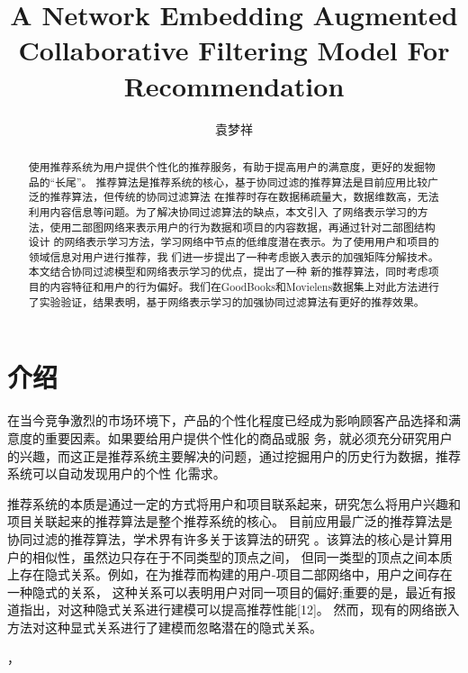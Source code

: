 \documentclass[lang=cn,11pt]{elegantpaper}
\title{A Network Embedding Augmented Collaborative Filtering Model For Recommendation}
\author{袁梦祥}
\institute{安徽大学大数据与云服务工程实验室}
\date{}
\begin{document}
\maketitle

\begin{abstract}
\noindent 使用推荐系统为用户提供个性化的推荐服务，有助于提高用户的满意度，更好的发掘物品的“长尾”。
推荐算法是推荐系统的核心，基于协同过滤的推荐算法是目前应用比较广泛的推荐算法，但传统的协同过滤算法
在推荐时存在数据稀疏量大，数据维数高，无法利用内容信息等问题。为了解决协同过滤算法的缺点，本文引入
了网络表示学习的方法，使用二部图网络来表示用户的行为数据和项目的内容数据，再通过针对二部图结构设计
的网络表示学习方法，学习网络中节点的低维度潜在表示。为了使用用户和项目的领域信息对用户进行推荐，我
们进一步提出了一种考虑嵌入表示的加强矩阵分解技术。本文结合协同过滤模型和网络表示学习的优点，提出了一种
新的推荐算法，同时考虑项目的内容特征和用户的行为偏好。我们在GoodBooks和Movielens数据集上对此方法进行
了实验验证，结果表明，基于网络表示学习的加强协同过滤算法有更好的推荐效果。
\end{abstract}


\section{介绍}

在当今竞争激烈的市场环境下，产品的个性化程度已经成为影响顾客产品选择和满意度的重要因素。如果要给用户提供个性化的商品或服
务，就必须充分研究用户的兴趣，而这正是推荐系统主要解决的问题，通过挖掘用户的历史行为数据，推荐系统可以自动发现用户的个性
化需求。

推荐系统的本质是通过一定的方式将用户和项目联系起来，研究怎么将用户兴趣和项目关联起来的推荐算法是整个推荐系统的核心。
目前应用最广泛的推荐算法是协同过滤的推荐算法，学术界有许多关于该算法的研究
\cite{Linden2003,Miranda2009,Sarwar2001a,Su2009}。该算法的核心是计算用户的相似性，虽然边只存在于不同类型的顶点之间，
但同一类型的顶点之间本质上存在隐式关系。例如，在为推荐而构建的用户-项目二部网络中，用户之间存在一种隐式的关系，
这种关系可以表明用户对同一项目的偏好;重要的是，最近有报道指出，对这种隐式关系进行建模可以提高推荐性能[12]。
然而，现有的网络嵌入方法对这种显式关系进行了建模而忽略潜在的隐式关系。

\cite{Barkan2016}，
\end{document}
